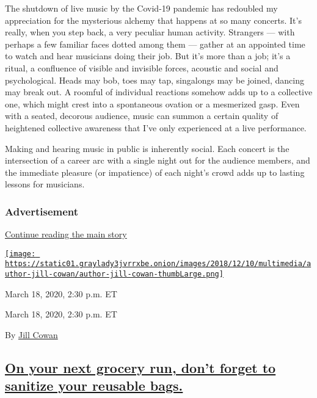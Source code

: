 The shutdown of live music by the Covid-19 pandemic has redoubled my
appreciation for the mysterious alchemy that happens at so many
concerts. It's really, when you step back, a very peculiar human
activity. Strangers --- with perhaps a few familiar faces dotted among
them --- gather at an appointed time to watch and hear musicians doing
their job. But it's more than a job; it's a ritual, a confluence of
visible and invisible forces, acoustic and social and psychological.
Heads may bob, toes may tap, singalongs may be joined, dancing may break
out. A roomful of individual reactions somehow adds up to a collective
one, which might crest into a spontaneous ovation or a mesmerized gasp.
Even with a seated, decorous audience, music can summon a certain
quality of heightened collective awareness that I've only experienced at
a live performance.

Making and hearing music in public is inherently social. Each concert is
the intersection of a career arc with a single night out for the
audience members, and the immediate pleasure (or impatience) of each
night's crowd adds up to lasting lessons for musicians.

\hypertarget{advertisement-5}{%
\subsubsection{Advertisement}\label{advertisement-5}}

\protect\hyperlink{after-dfp-ad-mid6}{Continue reading the main story}

\href{https://www.nytimes3xbfgragh.onion/by/jill-cowan}{\texttt{[image: https://static01.graylady3jvrrxbe.onion/images/2018/12/10/multimedia/author-jill-cowan/author-jill-cowan-thumbLarge.png]}}

March 18, 2020, 2:30 p.m. ET

March 18, 2020, 2:30 p.m. ET

By \href{https://www.nytimes3xbfgragh.onion/by/jill-cowan}{Jill Cowan}

\hypertarget{on-your-next-grocery-run-dont-forget-to-sanitize-your-reusable-bags}{%
\subsection{\texorpdfstring{\protect\hyperlink{on-your-next-grocery-run-dont-forget-to-sanitize-your-reusable-bags}{On
your next grocery run, don't forget to sanitize your reusable
bags.}}{On your next grocery run, don't forget to sanitize your reusable bags.}}\label{on-your-next-grocery-run-dont-forget-to-sanitize-your-reusable-bags}}

